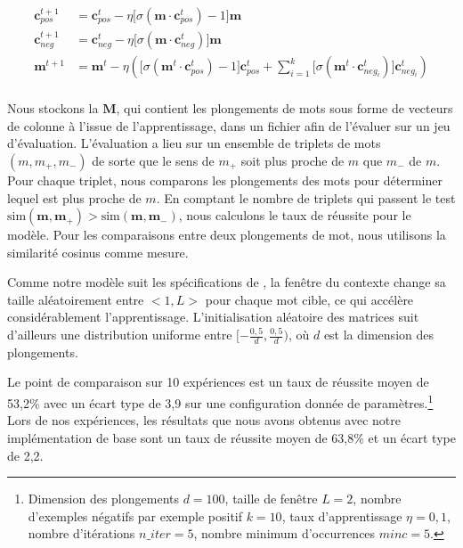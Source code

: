 \documentclass[12pt]{article}
\begin{document}
\begin{equation}\label{eq:update}
\begin{split}
    \mathbf{c}_{pos}^{t+1} & = \mathbf{c}_{pos}^t - \eta \lbrack \sigma(\mathbf{m} \cdot \mathbf{c}_{pos}^t) - 1 \rbrack \mathbf{m} \\
    \mathbf{c}_{neg}^{t+1} & = \mathbf{c}_{neg}^t - \eta \lbrack \sigma(\mathbf{m} \cdot \mathbf{c}_{neg}^t)\rbrack \mathbf{m} \\
    \mathbf{m}^{t+1} & = \mathbf{m}^t - \eta (\lbrack \sigma(\mathbf{m}^t \cdot \mathbf{c}_{pos}^t) - 1\rbrack \mathbf{c}_{pos}^t + \sum_{i=1}^k \lbrack \sigma(\mathbf{m}^t \cdot \mathbf{c}_{neg_i}^t) \rbrack \mathbf{c}_{neg_i}^t) \\
\end{split}
\end{equation}

Nous stockons la $\mathbf{M}$, qui contient les plongements de mots sous forme de vecteurs de colonne à l'issue de l'apprentissage, dans un fichier afin de l'évaluer sur un jeu d'évaluation. L'évaluation a lieu sur un ensemble de triplets de mots $(m, m_+, m_-)$ de sorte que le sens de $m_+$ soit plus proche de $m$ que $m_-$ de $m$. Pour chaque triplet, nous comparons les plongements des mots pour déterminer lequel est plus proche de $m$. En comptant le nombre de triplets qui passent le test $ \text{sim}(\mathbf{m}, \mathbf{m}_+) > \text{sim}(\mathbf{m}, \mathbf{m}_-)$, nous calculons le taux de réussite pour le modèle. Pour les comparaisons entre deux plongements de mot, nous utilisons la similarité cosinus comme mesure. 

Comme notre modèle suit les spécifications de \cite{DBLP:journals/corr/abs-1301-3781}, la fenêtre du contexte change sa taille aléatoirement entre $<1, L>$ pour chaque mot cible, ce qui accélère considérablement l'apprentissage. L'initialisation aléatoire des matrices suit d'ailleurs une distribution uniforme entre $[-\frac{0{,}5}{d}, \frac{0{,}5}{d})$, où $d$ est la dimension des plongements.

Le point de comparaison sur 10 expériences est un taux de réussite moyen de 53{,}2\% avec un écart type de 3{,}9 sur une configuration donnée de paramètres.\footnote{Dimension des plongements $d=100$, taille de fenêtre $L=2$, nombre d'exemples négatifs par exemple positif $k=10$, taux d'apprentissage $\eta=0{,}1$, nombre d'itérations $n\_ iter=5$, nombre minimum d'occurrences $minc=5$.} Lors de nos expériences, les résultats que nous avons obtenus avec notre implémentation de base sont un taux de réussite moyen de 63{,}8\% et un écart type de 2{,}2.
\end{document}
